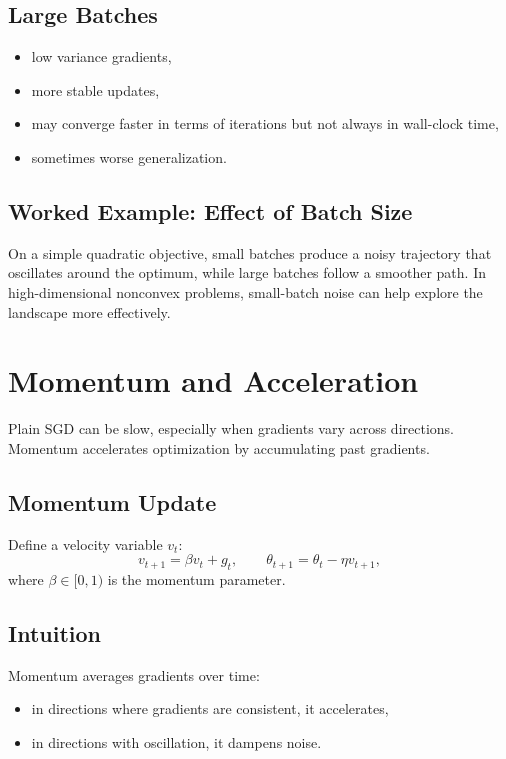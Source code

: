 \subsection{Large Batches}

\begin{itemize}
    \item low variance gradients,
    \item more stable updates,
    \item may converge faster in terms of iterations but not always in wall-clock time,
    \item sometimes worse generalization.
\end{itemize}

\subsection{Worked Example: Effect of Batch Size}

On a simple quadratic objective, small batches produce a noisy trajectory that oscillates around the optimum, while large batches follow a smoother path. In high-dimensional nonconvex problems, small-batch noise can help explore the landscape more effectively.

\section{Momentum and Acceleration}

Plain SGD can be slow, especially when gradients vary across directions. Momentum accelerates optimization by accumulating past gradients.

\subsection{Momentum Update}

Define a velocity variable $v_t$:
\[
v_{t+1}=\beta v_t + g_t,
\qquad
\theta_{t+1}=\theta_t-\eta v_{t+1},
\]
where $\beta\in[0,1)$ is the momentum parameter.

\subsection{Intuition}

Momentum averages gradients over time:
\begin{itemize}
    \item in directions where gradients are consistent, it accelerates,
    \item in directions with oscillation, it dampens noise.
\end{itemize}

